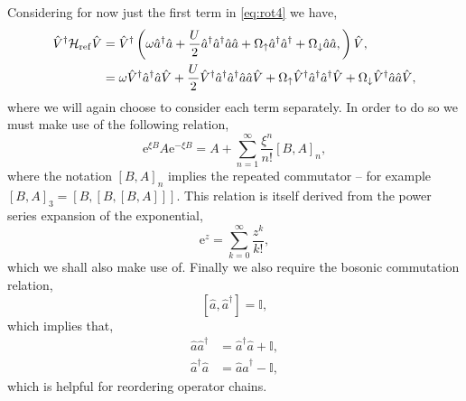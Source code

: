 Considering for now just the first term in \cref{eq:rot4} we have,
\begin{align}
	  \hat{V}^{\dagger}\mathcal{H}_{\mathrm{ref}}\hat{V} &= \hat{V}^{\dagger}\left(  \omega\hat{a}^{\dagger}\hat{a} + \frac{U}{2}\hat{a}^{\dagger}\hat{a}^{\dagger}\hat{a}\hat{a} + \Omega_{\uparrow}\hat{a}^{\dagger}\hat{a}^{\dagger} + \Omega_{\downarrow}\hat{a}\hat{a}, \right)\hat{V}, \notag \\
	  &= \omega\hat{V}^{\dagger}\hat{a}^{\dagger}\hat{a}\hat{V} + \frac{U}{2}\hat{V}^{\dagger}\hat{a}^{\dagger}\hat{a}^{\dagger}\hat{a}\hat{a}\hat{V} + \Omega_{\uparrow}\hat{V}^{\dagger}\hat{a}^{\dagger}\hat{a}^{\dagger}\hat{V} + \Omega_{\downarrow}\hat{V}^{\dagger}\hat{a}\hat{a}\hat{V},
	  \label{eq:rot7}
\end{align}
where we will again choose to consider each term separately. In order to do so we must make use of the following relation,
\begin{equation}
	\mathrm{e}^{\xi B}A\mathrm{e}^{-\xi B} = A + \sum_{n=1}^{\infty} \frac{\xi^{n}}{n!}\left[B,A\right]_{n},
	\label{eq:rot8}
\end{equation}
where the notation \([B,A]_{n}\) implies the repeated commutator -- for example \([B,A]_{3} = [B, [B, [B,A]]]\). This relation is itself derived from the power series expansion of the exponential,
\begin{equation}
	\mathrm{e}^{z} = \sum_{k=0}^{\infty} \frac{z^{k}}{k!},
	\label{eq:rot9}
\end{equation}
which we shall also make use of. Finally we also require the bosonic commutation relation,
\begin{equation}
	\left[ \hat{a}, \hat{a}^{\dagger} \right] = \mathbb{I},
	\label{eq:rot10}
\end{equation}
which implies that,
\begin{align}
	\hat{a}\hat{a}^{\dagger} &= \hat{a}^{\dagger}\hat{a} + \mathbb{I}, \label{eq:rot11} \\
	\hat{a}^{\dagger}\hat{a} &= \hat{a}\hat{a}^{\dagger} - \mathbb{I}, \label{eq:rot12}
\end{align}
which is helpful for reordering operator chains.

